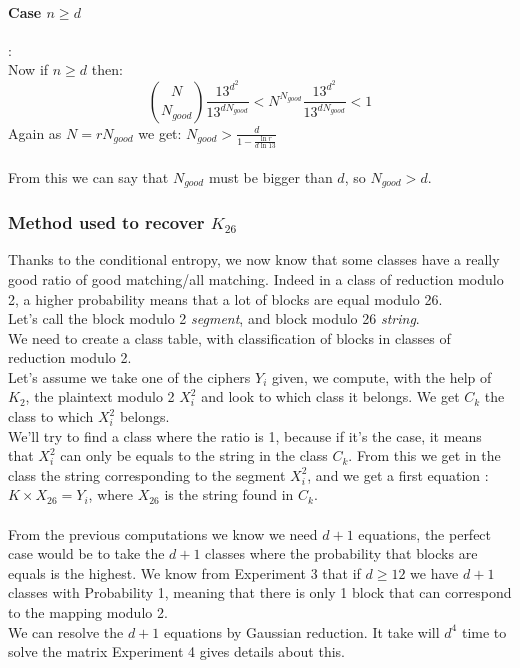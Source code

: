 \documentclass{article}
\begin{document}
\paragraph{Case $n \geq d$}:\\

Now if $n \geq d$ then: 
$${N \choose N_{good}} \frac{13^{d^{2}}}{13^{d N_{good}}} <  N^{N_{good}} \frac{13^{d^{2}}}{13^{d N_{good}}} < 1$$
Again as $N = r N_{good}$ we get: $N_{good} > \frac{d}{1-\frac{\ln r}{d \ln 13}}$\\
\\
From this we can say that $N_{good}$ must be bigger than $d$, so $N_{good} > d$.\\
\subsubsection{Method used to recover $K_{26}$}
Thanks to the conditional entropy, we now know that some classes have a really good ratio of good matching/all matching. Indeed in a class of reduction modulo 2, a higher probability means that a lot of blocks are equal modulo 26.\\
Let's call the block modulo 2 \textit{segment}, and block modulo 26 \textit{string}.\\
We need to create a class table, with classification of blocks in classes of reduction modulo 2.\\
Let's assume we take one of the ciphers $Y_i$ given, we compute, with the help of $ K_{2} $, the plaintext modulo 2 $X^{2}_i$ and look to which class it belongs. We get $C_k$ the class to which $X^{2}_i$ belongs.\\
We'll try to find a class where the ratio is 1, because if it's the case, it means that $X^{2}_i$ can only be equals to the string in the class $C_k$. From this we get in the class the string corresponding to the segment $X^{2}_i$, and we get a first equation : $K \times X_{26} = Y_{i}$, where $X_{26}$ is the string found in $C_k$.\\
\\
From the previous computations we know we need $d+1$ equations, the perfect case would be to take the $d+1$ classes where the probability that blocks are equals is the highest. We know from Experiment 3 that if $d \geq 12$ we have $ d+1$ classes with Probability 1, meaning that there is only 1 block that can correspond to the mapping modulo 2.\\
We can resolve the $d+1$ equations by Gaussian reduction. It take will $d^4$ time to solve the matrix Experiment 4 gives details about this.\\
\\
\end{document}
